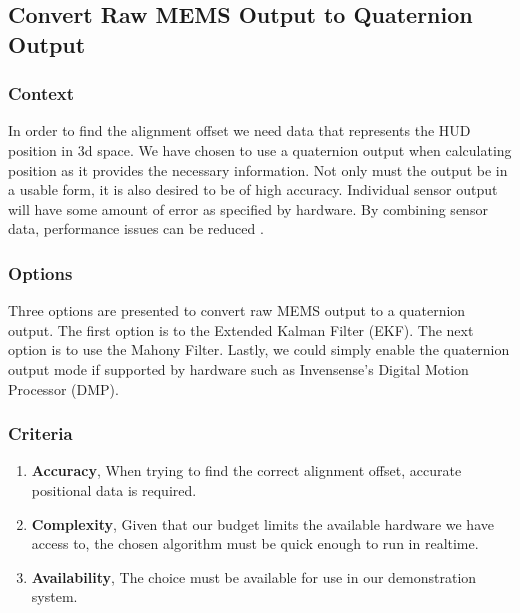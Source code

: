 \subsection{Convert Raw MEMS Output to Quaternion Output}
\subsubsection{Context}
In order to find the alignment offset we need data that represents the HUD position in 3d space.
We have chosen to use a quaternion output when calculating position as it provides the necessary information.
Not only must the output be in a usable form, it is also desired to be of high accuracy.
Individual sensor output will have some amount of error as specified by hardware.
By combining sensor data, performance issues can be reduced \cite{MOUSER}. \\

\subsubsection{Options}
Three options are presented to convert raw MEMS output to a quaternion output.
The first option is to the Extended Kalman Filter (EKF).
The next option is to use the Mahony Filter.
Lastly, we could simply enable the quaternion output mode if supported by hardware such as Invensense’s Digital Motion Processor (DMP).\\


\subsubsection{Criteria}
\begin{enumerate}
	\item \textbf{Accuracy}, When trying to find the correct alignment offset, accurate positional data is required.
	\item \textbf{Complexity}, Given that our budget limits the available hardware we have access to, the chosen algorithm must be quick enough to run in realtime.
	\item \textbf{Availability}, The choice must be available for use in our demonstration system. \\
\end{enumerate}

\newpage
